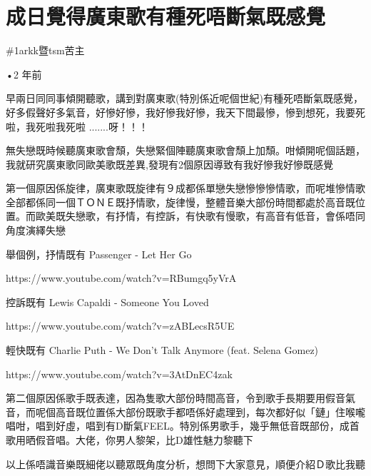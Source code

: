 \chapter{成日覺得廣東歌有種死唔斷氣既感覺}

\#1arkk暨tsm苦主

•2 年前

早兩日同同事傾開聽歌，講到對廣東歌(特別係近呢個世紀)有種死唔斷氣既感覺，好多假聲好多氣音，好慘好慘，我好慘我好慘，我天下間最慘，慘到想死，我要死啦，我死啦我死啦 .......呀！！！

無失戀既時候聽廣東歌會頹，失戀緊個陣聽廣東歌會頹上加頹。咁傾開呢個話題，我就研究廣東歌同歐美歌既差異,發現有2個原因導致有我好慘我好慘既感覺

第一個原因係旋律，廣東歌既旋律有９成都係單戀失戀慘慘慘情歌，而呢堆慘情歌全部都係同一個ＴＯＮＥ既抒情歌，旋律慢，整體音樂大部份時間都處於高音既位置。而歐美既失戀歌，有抒情，有控訴，有快歌有慢歌，有高音有低音，會係唔同角度演繹失戀

舉個例，抒情既有 Passenger - Let Her Go

https://www.youtube.com/watch?v=RBumgq5yVrA

控訴既有 Lewis Capaldi - Someone You Loved

https://www.youtube.com/watch?v=zABLecsR5UE

輕快既有 Charlie Puth - We Don't Talk Anymore (feat. Selena Gomez)

https://www.youtube.com/watch?v=3AtDnEC4zak

第二個原因係歌手既表達，因為隻歌大部份時間高音，令到歌手長期要用假音氣音，而呢個高音既位置係大部份既歌手都唔係好處理到，每次都好似「鏈」住喉嚨唱咁，唱到好虛，唱到有D斷氣FEEL。特別係男歌手，幾乎無低音既部份，成首歌用晒假音唱。大佬，你男人黎架，比D雄性魅力黎聽下

以上係唔識音樂既細佬以聽眾既角度分析，想問下大家意見，順便介紹Ｄ歌比我聽

